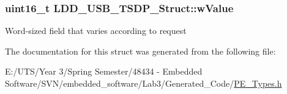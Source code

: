 \subsubsection[{w\+Value}]{\setlength{\rightskip}{0pt plus 5cm}uint16\+\_\+t L\+D\+D\+\_\+\+U\+S\+B\+\_\+\+T\+S\+D\+P\+\_\+\+Struct\+::w\+Value}\label{struct_l_d_d___u_s_b___t_s_d_p___struct_abe97822a1a8976f53da5a43b8db8cfd3}
Word-\/sized field that varies according to request 

The documentation for this struct was generated from the following file\+:\begin{DoxyCompactItemize}
\item 
E\+:/\+U\+T\+S/\+Year 3/\+Spring Semester/48434 -\/ Embedded Software/\+S\+V\+N/embedded\+\_\+software/\+Lab3/\+Generated\+\_\+\+Code/\hyperlink{_p_e___types_8h}{P\+E\+\_\+\+Types.\+h}\end{DoxyCompactItemize}
